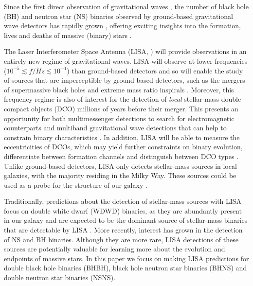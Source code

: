 Since the first direct observation of gravitational waves \citep{Abbott+2016_first_detection}, the number of black hole (BH) and neutron star (NS) binaries observed by ground-based gravitational wave detectors has rapidly grown \citep{Abbott+2019_GWTC1,Abbott+2020_GWTC2}, offering exciting insights into the formation, lives and deaths of massive (binary) stars \citep[e.g.][]{Abbott+2021_GWTC2_inference}.

The Laser Interferometer Space Antenna (LISA, \citealp{Amaro-Seoane+2017, Colpi+2019}) will provide observations in an entirely new regime of gravitational waves. LISA will observe at lower frequencies ($10^{-5} \lesssim f / \unit{Hz} \lesssim 10^{-1}$) than ground-based detectors and so will enable the study of sources that are imperceptible by ground-based detectors, such as the mergers of supermassive black holes and extreme mass ratio inspirals \citep[e.g.][]{Begelman+1980, Klein+2016}. Moreover, this frequency regime is also of interest for the detection of \textit{local} stellar-mass double compact objects (DCO) millions of years before their merger. This presents an opportunity for both multimessenger detections to search for electromagnetic counterparts and multiband gravitational wave detections that can help to constrain binary characteristics \citep[e.g.][]{Sesana+2016, Gerosa+2019}. In addition, LISA will be able to measure the eccentricities of DCOs, which may yield further constraints on binary evolution, differentiate between formation channels and distinguish between DCO types \citep[e.g.][]{Nelemans+2001, Breivik+2016, Antonini+2017, Rodriguez+2018}. Unlike ground-based detectors, LISA only detects stellar-mass sources in local galaxies, with the majority residing in the Milky Way. These sources could be used as a probe for the structure of our galaxy \citep[e.g.][]{Korol+2019}.

Traditionally, predictions about the detection of stellar-mass sources with LISA focus on double white dwarf (WDWD) binaries, as they are abundantly present in our galaxy and are expected to be the dominant source of stellar-mass binaries that are detectable by LISA \citep{Nelemans+2001,Ruiter+2010,Yu+2010,Nissanke+2012,Korol+2017,Lamberts+2018}. More recently, interest has grown in the detection of NS and BH binaries. Although they are more rare, LISA detections of these sources are potentially valuable for learning more about the evolution and endpoints of massive stars. In this paper we focus on making LISA predictions for double black hole binaries (BHBH), black hole neutron star binaries (BHNS) and double neutron star binaries (NSNS).

